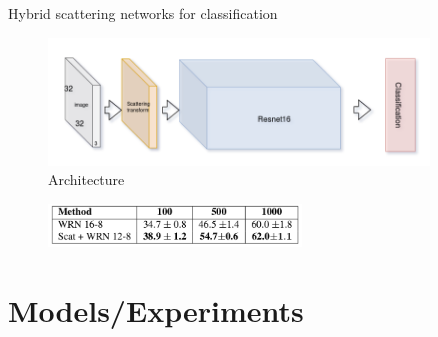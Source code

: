 \documentclass[compress]{beamer}
\begin{document}
	\begin{frame}{Hybrid scattering networks for classification}
		\begin{figure}
			\includegraphics[width=0.9\textwidth]{images/arch_hybrid_scattering_CIFAR10.png}
			\caption{Architecture \cite{ScalingTheScatteringTransform2017}}
		\end{figure}
		\begin{figure}
			\includegraphics[width=0.6\textwidth]{images/results_scaling_the_scattering.png}
		\end{figure}
	\end{frame}
	\section{Models/Experiments}
\end{document}

